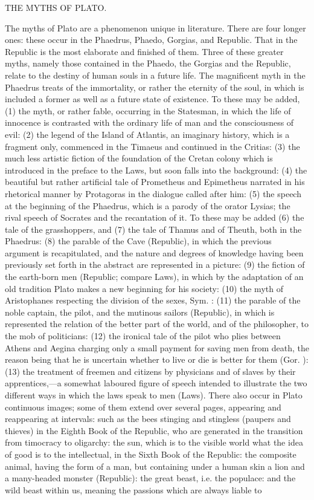 \documentclass[11pt,letter]{article}
\begin{document}
\par  THE MYTHS OF PLATO.

\par  The myths of Plato are a phenomenon unique in literature. There are four longer ones: these occur in the Phaedrus, Phaedo, Gorgias, and Republic. That in the Republic is the most elaborate and finished of them. Three of these greater myths, namely those contained in the Phaedo, the Gorgias and the Republic, relate to the destiny of human souls in a future life. The magnificent myth in the Phaedrus treats of the immortality, or rather the eternity of the soul, in which is included a former as well as a future state of existence. To these may be added, (1) the myth, or rather fable, occurring in the Statesman, in which the life of innocence is contrasted with the ordinary life of man and the consciousness of evil: (2) the legend of the Island of Atlantis, an imaginary history, which is a fragment only, commenced in the Timaeus and continued in the Critias: (3) the much less artistic fiction of the foundation of the Cretan colony which is introduced in the preface to the Laws, but soon falls into the background: (4) the beautiful but rather artificial tale of Prometheus and Epimetheus narrated in his rhetorical manner by Protagoras in the dialogue called after him: (5) the speech at the beginning of the Phaedrus, which is a parody of the orator Lysias; the rival speech of Socrates and the recantation of it. To these may be added (6) the tale of the grasshoppers, and (7) the tale of Thamus and of Theuth, both in the Phaedrus: (8) the parable of the Cave (Republic), in which the previous argument is recapitulated, and the nature and degrees of knowledge having been previously set forth in the abstract are represented in a picture: (9) the fiction of the earth-born men (Republic; compare Laws), in which by the adaptation of an old tradition Plato makes a new beginning for his society: (10) the myth of Aristophanes respecting the division of the sexes, Sym. : (11) the parable of the noble captain, the pilot, and the mutinous sailors (Republic), in which is represented the relation of the better part of the world, and of the philosopher, to the mob of politicians: (12) the ironical tale of the pilot who plies between Athens and Aegina charging only a small payment for saving men from death, the reason being that he is uncertain whether to live or die is better for them (Gor. ): (13) the treatment of freemen and citizens by physicians and of slaves by their apprentices,—a somewhat laboured figure of speech intended to illustrate the two different ways in which the laws speak to men (Laws). There also occur in Plato continuous images; some of them extend over several pages, appearing and reappearing at intervals: such as the bees stinging and stingless (paupers and thieves) in the Eighth Book of the Republic, who are generated in the transition from timocracy to oligarchy: the sun, which is to the visible world what the idea of good is to the intellectual, in the Sixth Book of the Republic: the composite animal, having the form of a man, but containing under a human skin a lion and a many-headed monster (Republic): the great beast, i.e. the populace: and the wild beast within us, meaning the passions which are always liable to 
\end{document}
